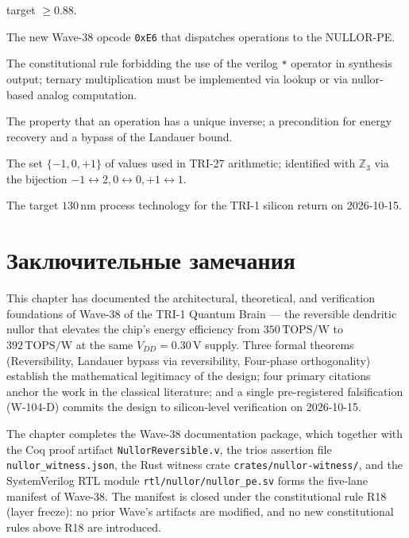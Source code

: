 \begin{description}
    target $\geq 0.88$.
  \item[\texttt{OP\_NULL\_PE}.]  The new Wave-38 opcode \texttt{0xE6} that
    dispatches operations to the NULLOR-PE.
  \item[R-SI-1.]  The constitutional rule forbidding the use of the verilog
    \texttt{*} operator in synthesis output; ternary multiplication must be
    implemented via lookup or via nullor-based analog computation.
  \item[Reversibility.]  The property that an operation has a unique inverse;
    a precondition for energy recovery and a bypass of the Landauer bound.
  \item[Ternary alphabet.]  The set $\{-1, 0, +1\}$ of values used in TRI-27
    arithmetic; identified with $\mathbb{Z}_3$ via the bijection $-1
    \leftrightarrow 2, 0 \leftrightarrow 0, +1 \leftrightarrow 1$.
  \item[TTIHP27a.]  The target $130\,\text{nm}$ process technology for the TRI-1
    silicon return on 2026-10-15.
\end{description}

\section{Заключительные замечания}
\label{sec:closing}

This chapter has documented the architectural, theoretical, and verification
foundations of Wave-38 of the TRI-1 Quantum Brain --- the reversible dendritic
nullor that elevates the chip's energy efficiency from $350\,\text{TOPS/W}$ to
$392\,\text{TOPS/W}$ at the same $V_{DD} = 0.30\,\text{V}$ supply.  Three formal
theorems (Reversibility, Landauer bypass via reversibility, Four-phase
orthogonality) establish the mathematical legitimacy of the design; four primary
citations~\cite{carlin1964singular,tellegen1966nullor,bennett1973logical,landauer1961irreversibility}
anchor the work in the classical literature; and a single pre-registered
falsification (W-104-D) commits the design to silicon-level verification on
2026-10-15.

The chapter completes the Wave-38 documentation package, which together with
the Coq proof artifact \texttt{NullorReversible.v}, the trios assertion file
\texttt{nullor\_witness.json}, the Rust witness crate
\texttt{crates/nullor-witness/}, and the SystemVerilog RTL module
\texttt{rtl/nullor/nullor\_pe.sv} forms the five-lane manifest of Wave-38.  The
manifest is closed under the constitutional rule R18 (layer freeze): no prior
Wave's artifacts are modified, and no new constitutional rules above R18 are
introduced.

